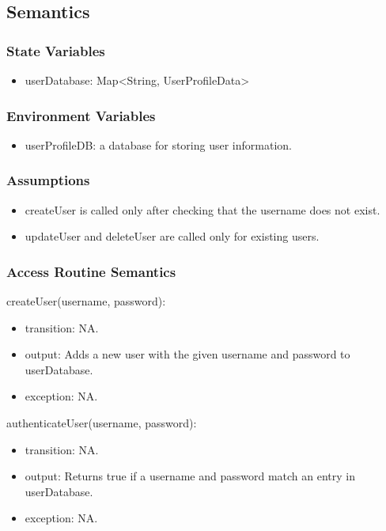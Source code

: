 \documentclass[12pt, titlepage]{article}
\begin{document}
\subsection{Semantics}

\subsubsection{State Variables}
\begin{itemize}
\item userDatabase: Map\textless String, UserProfileData\textgreater
\end{itemize}

\subsubsection{Environment Variables}
\begin{itemize}
\item userProfileDB: a database for storing user information.
\end{itemize}

\subsubsection{Assumptions}
\begin{itemize}
\item createUser is called only after checking that the username does not exist.
\item updateUser and deleteUser are called only for existing users.

\end{itemize}


\subsubsection{Access Routine Semantics}

\noindent createUser(username, password):
\begin{itemize}
\item transition: NA.
\item output: Adds a new user with the given username and password to userDatabase.
\item exception: NA.
\end{itemize}

\noindent authenticateUser(username, password):
\begin{itemize}
\item transition: NA.
\item output: Returns true if a username and password match an entry in userDatabase.
\item exception: NA.
\end{itemize}
\end{document}
